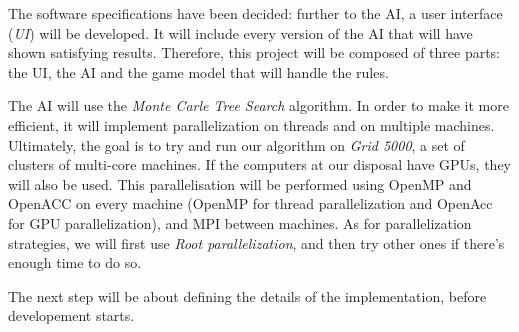 The software specifications have been decided: further to the AI, a user interface (\emph{UI}) will be developed.
It will include every version of the AI that will have shown satisfying results.
Therefore, this project will be composed of three parts: the UI, the AI and the game model that will handle the rules.

The AI will use the \emph{Monte Carle Tree Search} algorithm.
In order to make it more efficient, it will implement parallelization on threads and on multiple machines.
Ultimately, the goal is to try and run our algorithm on \emph{Grid 5000}, a set of clusters of multi-core machines.
If the computers at our disposal have GPUs, they will also be used.
This parallelisation will be performed using OpenMP and OpenACC on every machine (OpenMP for thread parallelization and OpenAcc for GPU parallelization), and MPI between machines.
As for parallelization strategies, we will first use \emph{Root parallelization}, and then try other ones if there's enough time to do so.

The next step will be about defining the details of the implementation, before developement starts.